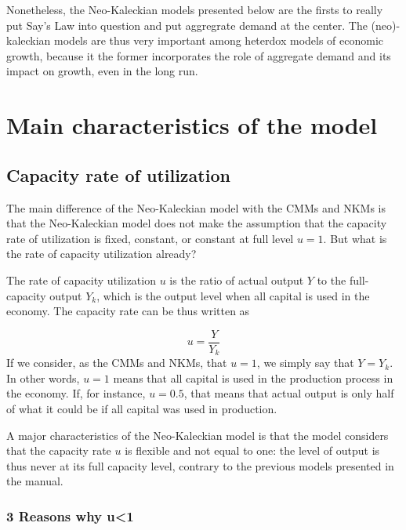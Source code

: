 \documentclass[
  letterpaper,
  DIV=11,
  numbers=noendperiod]{scrreprt}
\begin{document}
Nonetheless, the Neo-Kaleckian models presented below are the firsts to
really put Say's Law into question and put aggregrate demand at the
center. The (neo)-kaleckian models are thus very important among
heterdox models of economic growth, because it the former incorporates
the role of aggregate demand and its impact on growth, even in the long
run.

\hypertarget{main-characteristics-of-the-model}{%
\section{Main characteristics of the
model}\label{main-characteristics-of-the-model}}

\hypertarget{capacity-rate-of-utilization}{%
\subsection{Capacity rate of
utilization}\label{capacity-rate-of-utilization}}

The main difference of the Neo-Kaleckian model with the CMMs and NKMs is
that the Neo-Kaleckian model does not make the assumption that the
capacity rate of utilization is fixed, constant, or constant at full
level \(u = 1\). But what is the rate of capacity utilization already?

The rate of capacity utilization \(u\) is the ratio of actual output
\(Y\) to the full-capacity output \(Y_k\), which is the output level
when all capital is used in the economy. The capacity rate can be thus
written as

\[u = \frac{Y}{Y_k}\] If we consider, as the CMMs and NKMs, that
\(u = 1\), we simply say that \(Y = Y_k\). In other words, \(u = 1\)
means that all capital is used in the production process in the economy.
If, for instance, \(u = 0.5\), that means that actual output is only
half of what it could be if all capital was used in production.

A major characteristics of the Neo-Kaleckian model is that the model
considers that the capacity rate \(u\) is flexible and not equal to one:
the level of output is thus never at its full capacity level, contrary
to the previous models presented in the manual.

\hypertarget{reasons-why-u1}{%
\subsubsection{3 Reasons why u\textless1}\label{reasons-why-u1}}
\end{document}
